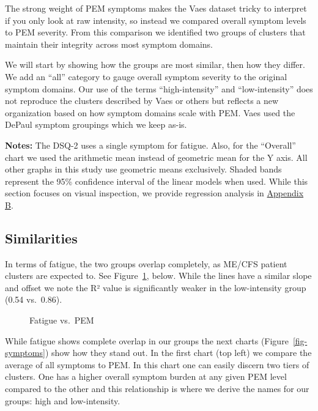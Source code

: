 \documentclass[
  letterpaper,
  DIV=11,
  numbers=noendperiod]{scrartcl}
\begin{document}
The strong weight of PEM symptoms makes the Vaes dataset tricky to
interpret if you only look at raw intensity, so instead we compared
overall symptom levels to PEM severity. From this comparison we
identified two groups of clusters that maintain their integrity across
most symptom domains.

We will start by showing how the groups are most similar, then how they
differ. We add an ``all'' category to gauge overall symptom severity to
the original symptom domains. Our use of the terms ``high-intensity''
and ``low-intensity'' does not reproduce the clusters described by Vaes
or others but reflects a new organization based on how symptom domains
scale with PEM. Vaes used the DePaul symptom groupings which we keep
as-is.

\textbf{Notes:} The DSQ-2 uses a single symptom for fatigue. Also, for
the ``Overall'' chart we used the arithmetic mean instead of geometric
mean for the Y axis. All other graphs in this study use geometric means
exclusively. Shaded bands represent the 95\% confidence interval of the
linear models when used. While this section focuses on visual
inspection, we provide regression analysis in
\hyperref[sec-regression]{Appendix B}.

\subsection{Similarities}\label{similarities}

In terms of fatigue, the two groups overlap completely, as ME/CFS
patient clusters are expected to. See Figure~\ref{fig-fatigue}, below.
While the lines have a similar slope and offset we note the R² value is
significantly weaker in the low-intensity group (0.54 vs.~0.86).

\begin{figure}[h]


\caption{\label{fig-fatigue}Fatigue vs.~PEM}

\end{figure}%

\FloatBarrier

While fatigue shows complete overlap in our groups the next charts
(Figure~\ref{fig-symptoms}) show how they stand out. In the first chart
(top left) we compare the average of all symptoms to PEM. In this chart
one can easily discern two tiers of clusters. One has a higher overall
symptom burden at any given PEM level compared to the other and this
relationship is where we derive the names for our groups: high and
low-intensity.
\end{document}
